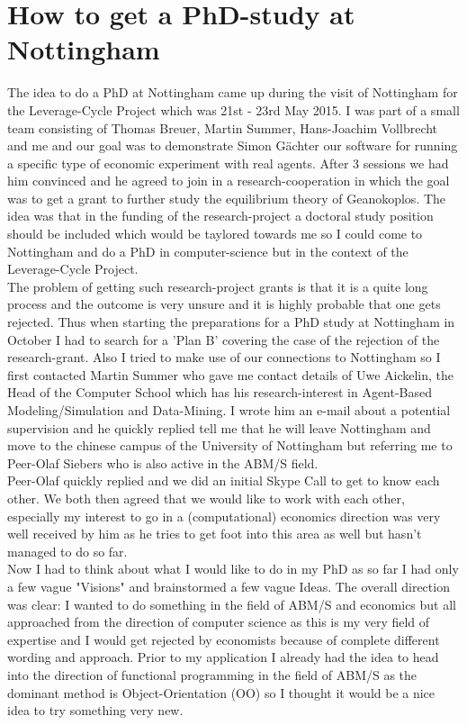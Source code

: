 \section{How to get a PhD-study at Nottingham}
\label{app:studentship}

The idea to do a PhD at Nottingham came up during the visit of Nottingham for the Leverage-Cycle Project which was 21st - 23rd May 2015. I was part of a small team consisting of Thomas Breuer, Martin Summer, Hans-Joachim Vollbrecht and me and our goal was to demonstrate Simon Gächter our software for running a specific type of economic experiment with real agents. After 3 sessions we had him convinced and he agreed to join in a research-cooperation in which the goal was to get a grant to further study the equilibrium theory of Geanokoplos. The idea was that in the funding of the research-project a doctoral study position should be included which would be taylored towards me so I could come to Nottingham and do a PhD in computer-science but in the context of the Leverage-Cycle Project. \\
The problem of getting such research-project grants is that it is a quite long process and the outcome is very unsure and it is highly probable that one gets rejected. Thus when starting the preparations for a PhD study at Nottingham in October I had to search for a 'Plan B' covering the case of the rejection of the research-grant. Also I tried to make use of our connections to Nottingham so I first contacted Martin Summer who gave me contact details of Uwe Aickelin, the Head of the Computer School which has his research-interest in Agent-Based Modeling/Simulation and Data-Mining. I wrote him an e-mail about a potential supervision and he quickly replied tell me that he will leave Nottingham and move to the chinese campus of the University of Nottingham but referring me to Peer-Olaf Siebers who is also active in the ABM/S field. \\
Peer-Olaf quickly replied and we did an initial Skype Call to get to know each other. We both then agreed that we would like to work with each other, especially my interest to go in a (computational) economics direction was very well received by him as he tries to get foot into this area as well but hasn't managed to do so far. \\
Now I had to think about what I would like to do in my PhD as so far I had only a few vague "Visions" and brainstormed a few vague Ideas. The overall direction was clear: I wanted to do something in the field of ABM/S and economics but all approached from the direction of computer science as this is my very field of expertise and I would get rejected by economists because of complete different wording and approach. Prior to my application I already had the idea to head into the direction of functional programming in the field of ABM/S as the dominant method is Object-Orientation (OO) so I thought it would be a nice idea to try something very new. \\
